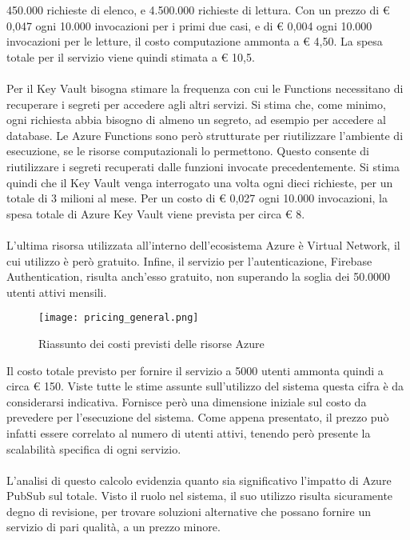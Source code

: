 450.000 richieste di elenco,
e 4.500.000 richieste di lettura.
Con un prezzo di € 0,047 ogni 10.000 invocazioni per i primi due casi,
e di € 0,004 ogni 10.000 invocazioni per le letture,
il costo computazione ammonta a € 4,50.
La spesa totale per il servizio viene quindi stimata a € 10,5.\\
\\
Per il Key Vault bisogna stimare la frequenza 
con cui le Functions necessitano di recuperare i segreti per accedere agli altri servizi.
Si stima che, come minimo, ogni richiesta abbia bisogno di almeno un segreto,
ad esempio per accedere al database.
Le Azure Functions sono però strutturate per riutilizzare 
l'ambiente di esecuzione, se le risorse computazionali lo permettono.
Questo consente di riutilizzare i segreti recuperati dalle funzioni invocate precedentemente.
Si stima quindi che il Key Vault venga interrogato una volta ogni dieci richieste,
per un totale di 3 milioni al mese.
Per un costo di € 0,027 ogni 10.000 invocazioni,
la spesa totale di Azure Key Vault viene prevista per circa € 8.\\
\\
L'ultima risorsa utilizzata all'interno dell'ecosistema Azure è Virtual Network, 
il cui utilizzo è però gratuito.
Infine, il servizio per l'autenticazione, Firebase Authentication,
risulta anch'esso gratuito, non superando la soglia dei 50.0000 utenti attivi mensili.
\clearpage
\begin{figure}[htbp]
    \begin{center}
        \texttt{[image: pricing\_general.png]}
        \caption{Riassunto dei costi previsti delle risorse Azure}
    \end{center}
\end{figure}
Il costo totale previsto per fornire il servizio a 5000 utenti ammonta quindi a circa € 150.
Viste tutte le stime assunte sull'utilizzo del sistema 
questa cifra è da considerarsi indicativa.
Fornisce però una dimensione iniziale sul costo da prevedere per l'esecuzione del sistema.
Come appena presentato, il prezzo può infatti essere correlato al numero di utenti attivi, 
tenendo però presente la scalabilità specifica di ogni servizio.\\
\\
L'analisi di questo calcolo evidenzia quanto sia significativo
l'impatto di Azure PubSub sul totale. 
Visto il ruolo nel sistema, 
il suo utilizzo risulta sicuramente degno di revisione,
per trovare soluzioni alternative che possano fornire 
un servizio di pari qualità, a un prezzo minore.


